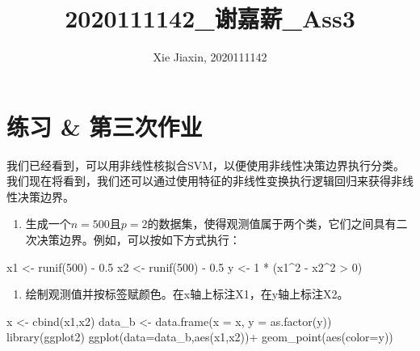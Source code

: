 \documentclass[
]{article}
\title{2020111142\_谢嘉薪\_Ass3}
\author{Xie Jiaxin, 2020111142}
\date{}
\newenvironment{Shaded}{\begin{snugshade}}{\end{snugshade}}
\newcommand{\AttributeTok}[1]{\textcolor[rgb]{0.77,0.63,0.00}{#1}}
\newcommand{\DecValTok}[1]{\textcolor[rgb]{0.00,0.00,0.81}{#1}}
\newcommand{\FloatTok}[1]{\textcolor[rgb]{0.00,0.00,0.81}{#1}}
\newcommand{\FunctionTok}[1]{\textcolor[rgb]{0.00,0.00,0.00}{#1}}
\newcommand{\NormalTok}[1]{#1}
\newcommand{\OtherTok}[1]{\textcolor[rgb]{0.56,0.35,0.01}{#1}}
\newcommand{\SpecialCharTok}[1]{\textcolor[rgb]{0.00,0.00,0.00}{#1}}
\providecommand{\tightlist}{%
  \setlength{\itemsep}{0pt}\setlength{\parskip}{0pt}}
\begin{document}
\maketitle

\hypertarget{ux7ec3ux4e60-ux7b2cux4e09ux6b21ux4f5cux4e1a}{%
\section{练习 \&
第三次作业}\label{ux7ec3ux4e60-ux7b2cux4e09ux6b21ux4f5cux4e1a}}

我们已经看到，可以用非线性核拟合SVM，以便使用非线性决策边界执行分类。我们现在将看到，我们还可以通过使用特征的非线性变换执行逻辑回归来获得非线性决策边界。

\begin{enumerate}
\def\labelenumi{(\alph{enumi})}
\tightlist
\item
  生成一个\(n = 500\)且\(p = 2\)的数据集，使得观测值属于两个类，它们之间具有二次决策边界。例如，可以按如下方式执行：
\end{enumerate}

\begin{Shaded}
\begin{Highlighting}[]
\NormalTok{x1 }\OtherTok{\textless{}{-}} \FunctionTok{runif}\NormalTok{(}\DecValTok{500}\NormalTok{) }\SpecialCharTok{{-}} \FloatTok{0.5}
\NormalTok{x2 }\OtherTok{\textless{}{-}} \FunctionTok{runif}\NormalTok{(}\DecValTok{500}\NormalTok{) }\SpecialCharTok{{-}} \FloatTok{0.5}
\NormalTok{y }\OtherTok{\textless{}{-}} \DecValTok{1} \SpecialCharTok{*}\NormalTok{ (x1}\SpecialCharTok{\^{}}\DecValTok{2} \SpecialCharTok{{-}}\NormalTok{ x2}\SpecialCharTok{\^{}}\DecValTok{2} \SpecialCharTok{\textgreater{}} \DecValTok{0}\NormalTok{)}
\end{Highlighting}
\end{Shaded}

\begin{enumerate}
\def\labelenumi{(\alph{enumi})}
\setcounter{enumi}{1}
\tightlist
\item
  绘制观测值并按标签赋颜色。在x轴上标注X1，在y轴上标注X2。
\end{enumerate}

\begin{Shaded}
\begin{Highlighting}[]
\NormalTok{x }\OtherTok{\textless{}{-}} \FunctionTok{cbind}\NormalTok{(x1,x2)}
\NormalTok{data\_b }\OtherTok{\textless{}{-}} \FunctionTok{data.frame}\NormalTok{(}\AttributeTok{x =}\NormalTok{ x, }\AttributeTok{y =} \FunctionTok{as.factor}\NormalTok{(y))}
\FunctionTok{library}\NormalTok{(ggplot2)}
\FunctionTok{ggplot}\NormalTok{(}\AttributeTok{data=}\NormalTok{data\_b,}\FunctionTok{aes}\NormalTok{(x1,x2))}\SpecialCharTok{+}
  \FunctionTok{geom\_point}\NormalTok{(}\FunctionTok{aes}\NormalTok{(}\AttributeTok{color=}\NormalTok{y))}
\end{Highlighting}
\end{Shaded}
\end{document}
